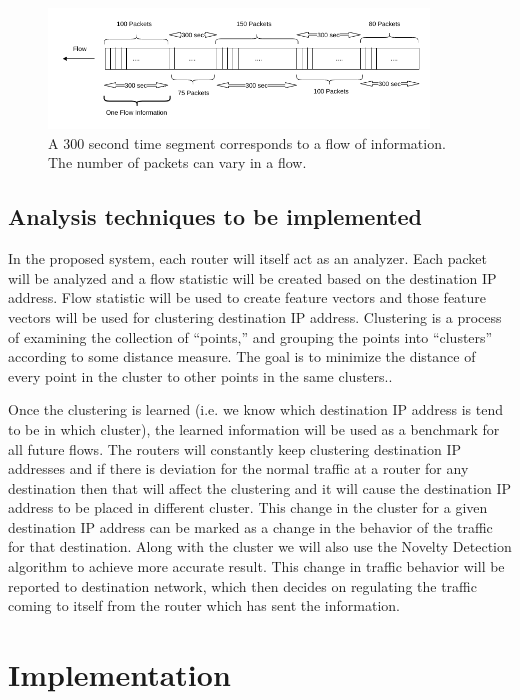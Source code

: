 \documentclass[12pt,oneside,a4paper]{article}
\begin{document}
\begin{figure}[H]
\centering
\includegraphics[width=0.90\textwidth]{Data_Flow_Capture.png}
\caption{A 300 second time segment corresponds to a flow of information. The number of packets can vary in a flow.} \label{fig:flow}
\end{figure}

\subsection{Analysis techniques to be implemented}
In the proposed system, each router will itself act as an analyzer. Each packet will be analyzed and a flow statistic will be created based on the destination IP address. Flow statistic will be used to create feature vectors and those feature vectors will be used for clustering destination IP address. Clustering is a process of examining the collection of “points,” and grouping the points into “clusters” according to some distance measure. The goal is to minimize the distance of every point in the cluster to other points in the same clusters.\cite{machine-learning}.

Once the clustering is learned (i.e. we know which destination IP address is tend to be in which cluster), the learned information will be used as a benchmark for all future flows. The routers will constantly keep clustering destination IP addresses and if there is deviation for the normal traffic at a router for any destination then that will affect the clustering and it will cause the destination IP address to be placed in different cluster. This change in the cluster for a given destination IP address can be marked as a change in the behavior of the traffic for that destination. Along with the cluster we will also use the Novelty Detection algorithm to achieve more accurate result. This change in traffic behavior will be reported to destination network, which then decides on regulating the traffic coming to itself from the router which has sent the information.

\section{Implementation}
\end{document}
